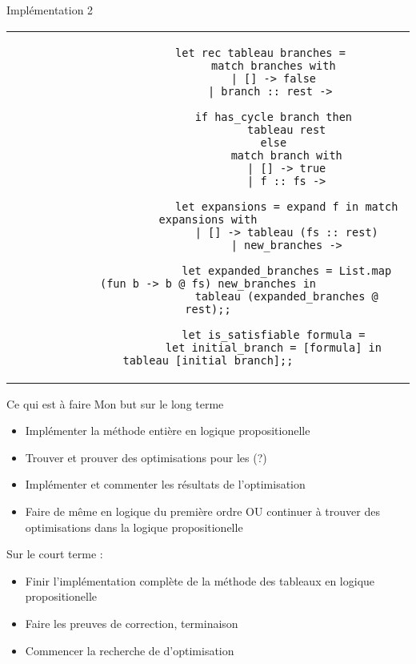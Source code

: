 \documentclass[]{beamer}
\begin{document}
\begin{frame}[fragile]{Implémentation 2}
    \begin{center}
        \begin{tabular}{c}
            \begin{lstlisting}
                let rec tableau branches =
                    match branches with
                    | [] -> false
                    | branch :: rest -> 

                    if has_cycle branch then
                        tableau rest
                    else
                        match branch with
                        | [] -> true
                        | f :: fs ->

                        let expansions = expand f in match expansions with
                        | [] -> tableau (fs :: rest)
                        | new_branches ->
                        
                        let expanded_branches = List.map (fun b -> b @ fs) new_branches in
                        tableau (expanded_branches @ rest);;

                    let is_satisfiable formula =
                    let initial_branch = [formula] in tableau [initial_branch];;
            \end{lstlisting}
        \end{tabular}
      \end{center}
\end{frame}

\begin{frame}{Ce qui est à faire}
    Mon but sur le long terme
    \begin{itemize}[<+->]
        \item Implémenter la méthode entière en logique propositionelle
        \item Trouver et prouver des optimisations pour les (?)
        \item Implémenter et commenter les résultats de l'optimisation
        \item Faire de même en logique du première ordre OU continuer à trouver des optimisations dans la logique propositionelle
    \end{itemize}
    \pause
    Sur le court terme :
    \begin{itemize}[<+->]
        \item Finir l'implémentation complète de la méthode des tableaux en logique propositionelle
        \item Faire les preuves de correction, terminaison
        \item Commencer la recherche de d'optimisation
    \end{itemize}
\end{frame}
\end{document}
